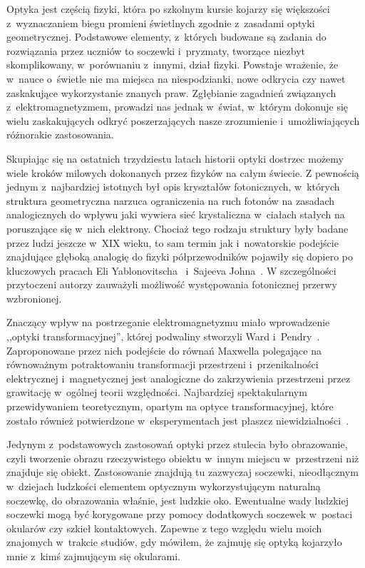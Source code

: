 Optyka jest częścią fizyki, która po szkolnym kursie kojarzy się większości z~wyznaczaniem biegu promieni świetlnych zgodnie z~zasadami optyki geometrycznej. Podstawowe elementy, z~których budowane są zadania do rozwiązania przez uczniów to soczewki i~pryzmaty, tworzące niezbyt skomplikowany, w~porównaniu z~innymi, dział fizyki. Powstaje wrażenie, że w~nauce o~świetle nie ma miejsca na niespodzianki, nowe odkrycia czy nawet zaskakujące wykorzystanie znanych praw. Zgłębianie zagadnień związanych z~elektromagnetyzmem, prowadzi nas jednak w~świat, w~którym dokonuje się wielu zaskakujących odkryć poszerzających nasze zrozumienie i~umożliwiających różnorakie zastosowania.

Skupiając się na ostatnich trzydziestu latach historii optyki dostrzec możemy wiele kroków milowych dokonanych przez fizyków na całym świecie. Z pewnością jednym z~najbardziej istotnych był opis kryształów fotonicznych, w~których struktura geometryczna narzuca ograniczenia na ruch fotonów na zasadach analogicznych do wpływu jaki wywiera sieć krystaliczna w~ciałach stałych na poruszające się w~nich elektrony. Chociaż tego rodzaju struktury były badane przez ludzi jeszcze w~XIX wieku, to sam termin jak i~nowatorskie podejście znajdujące głęboką analogię do fizyki półprzewodników pojawiły się dopiero po kluczowych pracach Eli Yablonovitscha~\cite{yablonovitch1987inhibited} i~Sajeeva Johna~\cite{john1987strong}. W szczególności przytoczeni autorzy zauważyli możliwość występowania fotonicznej przerwy wzbronionej.

Znaczący wpływ na postrzeganie elektromagnetyzmu miało wprowadzenie ,,optyki transformacyjnej'', której podwaliny stworzyli Ward i~Pendry~\cite{ward1996refraction}. Zaproponowane  przez nich podejście do równań Maxwella polegające na równoważnym potraktowaniu transformacji przestrzeni i~przenikalności elektrycznej i~magnetycznej jest analogiczne do zakrzywienia przestrzeni przez grawitację w~ogólnej teorii względności. Najbardziej spektakularnym przewidywaniem teoretycznym, opartym na optyce transformacyjnej, które zostało również potwierdzone w~eksperymentach jest płaszcz niewidzialności~\cite{schurig2006metamaterial}.

Jedynym z~podstawowych zastosowań optyki przez stulecia było obrazowanie, czyli tworzenie obrazu rzeczywistego obiektu w~innym miejscu w~przestrzeni niż znajduje się obiekt. Zastosowanie znajdują tu zazwyczaj soczewki, nieodłącznym w~dziejach ludzkości elementem optycznym wykorzystującym naturalną soczewkę, do obrazowania właśnie, jest ludzkie oko. Ewentualne wady ludzkiej soczewki mogą być korygowane przy pomocy dodatkowych soczewek w~postaci okularów czy szkieł kontaktowych. Zapewne z tego względu wielu moich znajomych w~trakcie studiów, gdy mówiłem, że zajmuję się optyką kojarzyło mnie z~kimś zajmującym się okularami.

